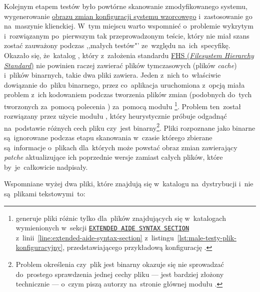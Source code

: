 \documentclass[thesis]{subfiles}
\begin{document}
Kolejnym etapem testów było powtórne skanowanie zmodyfikowanego systemu, wygenerowanie \hyperref[sec:obraz-zmian-konfiguracji]{obrazu zmian konfiguracji systemu wzorcowego} i~zastosowanie go na~maszynie klienckiej. W~tym miejscu warto wspomnieć o~problemie wykrytym i~rozwiązanym po~pierwszym tak przeprowadzonym teście, który nie miał szans zostać zauważony podczas ,,małych testów"' ze~względu na~ich~specyfikę. Okazało się, że~katalog , który z~założenia standardu \href{https://en.wikipedia.org/wiki/Filesystem_Hierarchy_Standard}{FHS (\emph{Filesystem Hierarchy Standard})} nie powinien raczej zawierać plików tymczasowych (plików \emph{cache}) i~plików binarnych, takie dwa pliki zawiera. Jeden z~nich to~właściwie dowiązanie do~pliku binarnego, przez co~aplikacja \texttt{\srvappname{}} uruchomiona z~opcją  miała problem z~ich kodowaniem podczas tworzenia plików zmian (podobnych do~tych tworzonych za~pomocą polecenia ) za~pomocą modułu \footnote{\texttt{\srvappname{}} generuje pliki różnic tylko dla~plików znajdujących się w~katalogach wymienionych w~sekcji \hyperref[line:extended-aide-syntax-section]{\texttt{EXTENDED AIDE SYNTAX SECTION}} z~linii~\ref{line:extended-aide-syntax-section} z~listingu~\ref{lst:male-testy-plik-konfiguracyjny}, przedstawiającego przykładową konfigurację \texttt{\srvappname{}}.}. Problem ten~został rozwiązany przez użycie modułu , który heurystycznie próbuje odgadnąć na~podstawie różnych cech pliku czy~jest binarny\footnote{Problem określenia czy~plik jest binarny okazuje się nie sprowadzać do~prostego sprawdzenia jednej cechy pliku --- jest bardziej złożony technicznie --- o~czym piszą autorzy na~stronie głównej modułu .}. Pliki rozpoznane jako binarne są~ignorowane podczas etapu skanowania w~czasie którego zbierane są~informacje o~plikach dla~których może powstać obraz zmian zawierający \emph{patche} aktualizujące ich poprzednie wersje zamiast całych plików, które by~je~całkowicie nadpisały.

Wspomniane wyżej dwa pliki, które znajdują się w~katalogu  na~dystrybucji \debian{} i~nie są~plikami tekstowymi~to:
\end{document}
